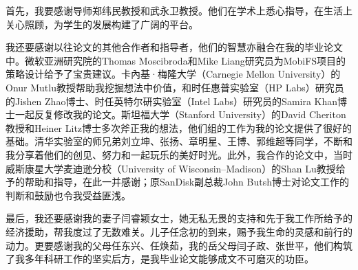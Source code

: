 
\begin{ack}

首先，我要感谢导师郑纬民教授和武永卫教授。他们在学术上悉心指导，在生活上关心照顾，为学生的发展构建了广阔的平台。

我还要感谢以往论文的其他合作者和指导者，他们的智慧亦融合在我的毕业论文中。微软亚洲研究院的Thomas Moscibroda和Mike Liang研究员为MobiFS项目的策略设计给予了宝贵建议。卡內基·梅隆大学（Carnegie Mellon University）的Onur Mutlu教授帮助我挖掘想法中价值，和时任惠普实验室（HP Labs）研究员的Jishen Zhao博士、时任英特尔研实验室（Intel Labs）研究员的Samira Khan博士一起反复修改我的论文。斯坦福大学（Stanford University）的David Cheriton教授和Heiner Litz博士多次斧正我的想法，他们组的工作为我的论文提供了很好的基础。清华实验室的师兄弟刘立坤、张扬、章明星、王博、郭维超等同学，不断和我分享着他们的创见、努力和一起玩乐的美好时光。此外，我合作的论文中，当时威斯康星大学麦迪逊分校（University of Wisconsin–Madison）的Shan Lu教授给予的帮助和指导，在此一并感谢；原SanDisk副总裁John Butsh博士对论文工作的判断和鼓励也令我受益匪浅。

最后，我还要感谢我的妻子闫睿颖女士，她无私无畏的支持和先于我工作所给予的经济援助，帮我度过了无数难关。儿子任念初的到来，赐予我生命的灵感和前行的动力。更要感谢我的父母任东兴、任焕茹，我的岳父母闫子政、张世平，他们构筑了我多年科研工作的坚实后方，是我毕业论文能够成文不可磨灭的功臣。

\end{ack}
